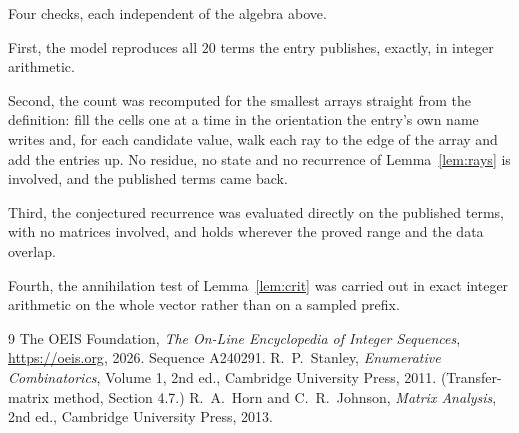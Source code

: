 \documentclass[11pt,a4paper]{article}
\theoremstyle{plain}
\theoremstyle{definition}
\begin{document}
Four checks, each independent of the algebra above.

First, the model reproduces all $20$ terms the entry publishes, exactly, in integer
arithmetic.

Second, the count was recomputed for the smallest arrays straight from the definition: fill the
cells one at a time in the orientation the entry's own name writes and, for each candidate
value, walk each ray to the edge of the array and add the entries up. No residue, no state and
no recurrence of Lemma~\ref{lem:rays} is involved, and the published terms came back.

Third, the conjectured recurrence was evaluated directly on the published terms, with no
matrices involved, and holds wherever the proved range and the data overlap.

Fourth, the annihilation test of Lemma~\ref{lem:crit} was carried out in exact integer
arithmetic on the whole vector rather than on a sampled prefix.

\begin{thebibliography}{9}
 The OEIS Foundation, \emph{The On-Line Encyclopedia of Integer
Sequences}, \url{https://oeis.org}, 2026. Sequence A240291.
 R.~P.~Stanley, \emph{Enumerative Combinatorics}, Volume 1, 2nd ed.,
Cambridge University Press, 2011. (Transfer-matrix method, Section 4.7.)
 R.~A.~Horn and C.~R.~Johnson, \emph{Matrix Analysis}, 2nd ed., Cambridge
University Press, 2013.
\end{thebibliography}
\end{document}
